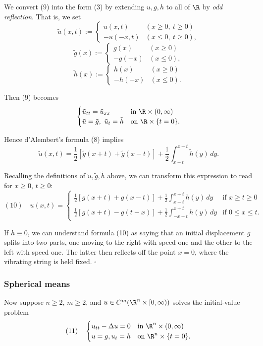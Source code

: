 We convert (9) into the form (3) by extending $u,g,h$ to all of $\R$ by \textit{odd reflection}. That is, we set
$$\tilde{u}(x,t) := \begin{cases} u(x,t) & (x \geq 0,\ t \geq 0) \\ -u(-x,t) & (x \leq 0,\ t \geq 0), \end{cases}$$
$$\tilde{g}(x) := \begin{cases} g(x) & (x \geq 0) \\ -g(-x) & (x \leq 0), \end{cases}$$
$$\tilde{h}(x) := \begin{cases} h(x) & (x \geq 0) \\ -h(-x) & (x \leq 0). \end{cases}$$

Then (9) becomes
$$\begin{cases} \tilde{u}_{tt} = \tilde{u}_{xx} & \text{in } \R\times(0,\infty) \\ \tilde{u} = \tilde{g},\ \tilde{u}_t = \tilde{h} & \text{on } \R\times\{t=0\}. \end{cases}$$

Hence d'Alembert's formula (8) implies
$$\tilde{u}(x,t) = \frac12[\tilde{g}(x+t)+\tilde{g}(x-t)] + \frac12\int_{x-t}^{x+t} \tilde{h}(y)\,dy.$$

Recalling the definitions of $\tilde{u},\tilde{g},\tilde{h}$ above, we can transform this expression to read for $x \geq 0$, $t \geq 0$:
$$(10) \quad u(x,t) = \begin{cases} \frac12[g(x+t)+g(x-t)] + \frac12\int_{x-t}^{x+t} h(y)\,dy & \text{if } x \geq t \geq 0 \\ \frac12[g(x+t)-g(t-x)] + \frac12\int_{-x+t}^{x+t} h(y)\,dy & \text{if } 0 \leq x \leq t. \end{cases}$$

If $h \equiv 0$, we can understand formula (10) as saying that an initial displacement $g$ splits into two parts, one moving to the right with speed one and the other to the left with speed one. The latter then reflects off the point $x=0$, where the vibrating string is held fixed. $\square$

\subsubsection{Spherical means}
\label{sec:wave-spherical-means}

Now suppose $n \geq 2$, $m \geq 2$, and $u \in C^m(\R^n \times [0, \infty))$ solves the initial-value problem
$$(11) \quad \begin{cases} u_{tt} - \Delta u = 0 & \text{in } \R^n \times (0, \infty) \\ u = g, u_t = h & \text{on } \R^n \times \{t = 0\}. \end{cases}$$

